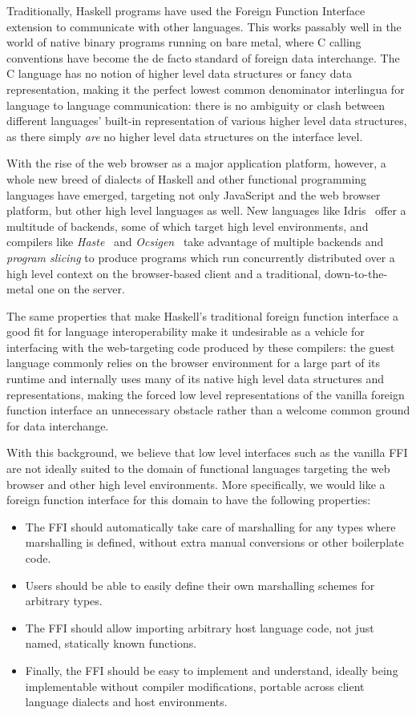 \documentclass[preprint]{sigplanconf}
\begin{document}
Traditionally, Haskell programs have used the Foreign Function Interface
extension to communicate with other languages. This works
passably well in the world of native binary programs running on bare metal,
where C calling conventions have become the de facto standard of foreign
data interchange.
The C language has no notion of higher level data structures or
fancy data representation, making it the perfect lowest common denominator
interlingua for language to language communication:
there is no ambiguity or clash between different languages' built-in
representation of various higher level data structures, as there simply
\emph{are} no higher level data structures on the interface level.

With the rise of the web browser as a major application platform, however,
a whole new breed of dialects of Haskell and other functional
programming languages have emerged, targeting not only JavaScript and the
web browser platform, but other high level languages as well.
New languages like Idris\ \cite{idris} offer a multitude of backends,
some of which target high level environments, and compilers like \emph{Haste}\
\cite{haste} and
\emph{Ocsigen}\ \cite{ocsigen} take advantage of multiple backends and
\emph{program slicing} to produce programs which run concurrently
distributed over a high level context on the browser-based client and a
traditional, down-to-the-metal one on the server.

The same properties that make Haskell's traditional foreign function interface
a good fit for language interoperability make it undesirable as a vehicle for
interfacing with the web-targeting code produced by these compilers: the guest
language commonly relies on the browser environment for a large part of its
runtime and internally uses many of its native high level data structures and
representations, making the forced low level representations of the vanilla
foreign function interface an unnecessary obstacle rather than a welcome
common ground for data interchange.

With this background, we believe that low level interfaces such as the
vanilla FFI are not ideally suited  to the domain of functional languages
targeting the web browser and other high level environments.
More specifically, we would like a foreign function interface for this domain
to have the following properties:

\begin{itemize}
\item
  The FFI should automatically take care of marshalling for any types where
  marshalling is defined, without extra manual conversions or other
  boilerplate code.
\item
  Users should be able to easily define their own marshalling schemes for
  arbitrary types.
\item
  The FFI should allow importing arbitrary host language code, not just named,
  statically known functions.
\item
  Finally, the FFI should be easy to implement and understand, ideally being
  implementable without compiler modifications, portable across client
  language dialects and host environments.
\end{itemize}
\end{document}
